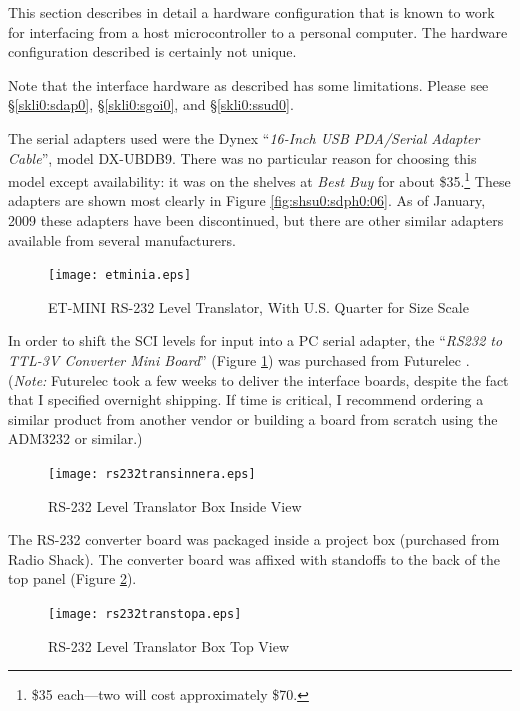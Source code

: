 \documentclass[letterpaper,10pt,titlepage]{article}
\begin{document}
This section describes in detail a hardware configuration that is known to work
for interfacing from a host microcontroller to a personal computer.
The hardware configuration described is certainly not unique.

Note that the interface hardware as described has some limitations.
Please see \S{}\ref{skli0:sdap0}, \S{}\ref{skli0:sgoi0}, and
\S{}\ref{skli0:ssud0}.

The serial adapters used were the Dynex \cite{bibref:vendor:dynex}
``\emph{16-Inch USB PDA/Serial Adapter Cable}'', model DX-UBDB9.
There was no particular reason for choosing this model except availability: 
it was on the shelves at \emph{Best Buy} for about \$35.\footnote{\$35 each---two
will cost approximately \$70.}  These adapters are shown most clearly in
Figure \ref{fig:shsu0:sdph0:06}.  As of January, 2009 these adapters have been
discontinued, but there are other similar adapters available from several
manufacturers.

\begin{figure}
\centering
\texttt{[image: etminia.eps]}
\caption{ET-MINI RS-232 Level Translator, With U.S. Quarter for Size Scale}
\label{fig:shsu0:sdph0:01}
\end{figure}

In order to shift the SCI levels for input into a PC serial adapter,
the ``\emph{RS232 to TTL-3V Converter Mini Board}'' (Figure \ref{fig:shsu0:sdph0:01})
was purchased from Futurelec \cite{bibref:vendor:futurelec}.
(\emph{Note:}  Futurelec took a few weeks to deliver the interface boards,
despite the fact that I specified overnight shipping.
If time is critical, I recommend ordering a similar product from another
vendor or building a board from scratch using the ADM3232 or similar.)

\begin{figure}
\centering
\texttt{[image: rs232transinnera.eps]}
\caption{RS-232 Level Translator Box Inside View}
\label{fig:shsu0:sdph0:02}
\end{figure}

The RS-232 converter board was packaged inside a project box
(purchased from Radio Shack).  The 
converter board was affixed with standoffs to the back of the top
panel (Figure \ref{fig:shsu0:sdph0:02}).

\begin{figure}
\centering
\texttt{[image: rs232transtopa.eps]}
\caption{RS-232 Level Translator Box Top View}
\label{fig:shsu0:sdph0:03}
\end{figure}
\end{document}
